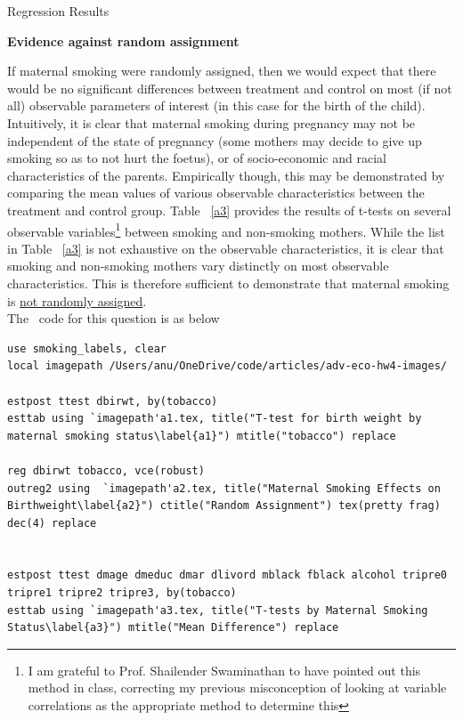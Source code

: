 \documentclass[12pt]{article}
\begin{document}


\begin{table}
\caption{Regression Results}

\end{table}

\textbf{Evidence against random assignment}

If maternal smoking were randomly assigned, then we would expect that there would be no significant differences between treatment and control on most (if not all) observable parameters of interest (in this case for the birth of the child). Intuitively, it is clear that maternal smoking during pregnancy may not be independent of the state of pregnancy (some mothers may decide to give up smoking so as to not hurt the foetus), or of socio-economic and racial characteristics of the parents. Empirically though, this may be demonstrated by comparing the mean values of various observable characteristics between the treatment and control group. Table ~\ref{a3} provides the results of t-tests on several observable variables\footnote{I am grateful to Prof. Shailender Swaminathan to have pointed out this method in class, correcting my previous misconception of looking at variable correlations as the appropriate method to determine this} between smoking and non-smoking mothers. While the list in Table ~\ref{a3} is not exhaustive on the observable characteristics, it is clear that smoking and non-smoking mothers vary distinctly on most observable characteristics. This is therefore sufficient to demonstrate that maternal smoking is \uline{not randomly assigned}. \\
 


The \stata \ code   for this question is as below
\begin{lstlisting}
use smoking_labels, clear
local imagepath /Users/anu/OneDrive/code/articles/adv-eco-hw4-images/

estpost ttest dbirwt, by(tobacco)
esttab using `imagepath'a1.tex, title("T-test for birth weight by maternal smoking status\label{a1}") mtitle("tobacco") replace

reg dbirwt tobacco, vce(robust)
outreg2 using  `imagepath'a2.tex, title("Maternal Smoking Effects on Birthweight\label{a2}") ctitle("Random Assignment") tex(pretty frag) dec(4) replace


estpost ttest dmage dmeduc dmar dlivord mblack fblack alcohol tripre0 tripre1 tripre2 tripre3, by(tobacco)
esttab using `imagepath'a3.tex, title("T-tests by Maternal Smoking Status\label{a3}") mtitle("Mean Difference") replace
\end{lstlisting}
\end{document}
